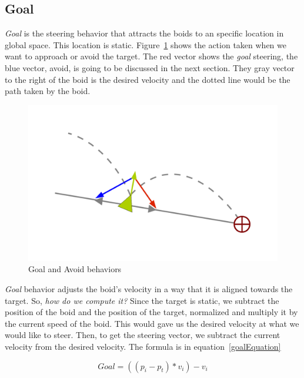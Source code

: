 \subsection{Goal}
\textit{Goal} is the steering behavior that attracts the boids to an specific location in global space. This location is static. Figure~\ref{seekfleePDF} shows the action taken when we want to approach or avoid the target. The red vector shows the \textit{goal} steering, the blue vector, avoid, is going to be discussed in the next section. They gray vector to the right of the boid is the desired velocity and the dotted line would be the path taken by the boid.

\begin{figure}[htbp]
\begin{center}
\includegraphics[scale=0.5]{figures/seekANDflee.pdf}
\caption{Goal and Avoid behaviors}
\label{seekfleePDF}
\end{center}
\end{figure}

\textit{Goal} behavior adjusts the boid's velocity in a way that it is aligned towards the target. So, \textit{how do we compute it?} Since the target is static, we subtract the position of the boid and the position of the target, normalized and multiply it by the current speed of the boid. This would gave us the desired velocity at what we would like to steer. Then, to get the steering vector, we subtract the current velocity from the desired velocity. The formula is in equation~\ref{goalEquation}

\begin{equation}
\label{goalEquation}
Goal = ((p_i - p_t) * v_i) - v_i
\end{equation}

